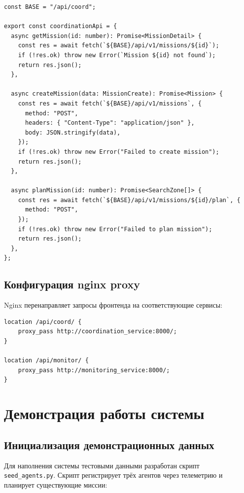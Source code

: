 \documentclass[12pt,a4paper]{article}
\begin{document}
\begin{lstlisting}[caption={frontend/src/api/coordinationApi.ts (фрагмент)}]
const BASE = "/api/coord";

export const coordinationApi = {
  async getMission(id: number): Promise<MissionDetail> {
    const res = await fetch(`${BASE}/api/v1/missions/${id}`);
    if (!res.ok) throw new Error(`Mission ${id} not found`);
    return res.json();
  },

  async createMission(data: MissionCreate): Promise<Mission> {
    const res = await fetch(`${BASE}/api/v1/missions`, {
      method: "POST",
      headers: { "Content-Type": "application/json" },
      body: JSON.stringify(data),
    });
    if (!res.ok) throw new Error("Failed to create mission");
    return res.json();
  },

  async planMission(id: number): Promise<SearchZone[]> {
    const res = await fetch(`${BASE}/api/v1/missions/${id}/plan`, {
      method: "POST",
    });
    if (!res.ok) throw new Error("Failed to plan mission");
    return res.json();
  },
};
\end{lstlisting}

\subsection{Конфигурация nginx proxy}

Nginx перенаправляет запросы фронтенда на соответствующие сервисы:

\begin{lstlisting}[style=bash, caption={frontend/nginx.conf (proxy-блоки)}]
location /api/coord/ {
    proxy_pass http://coordination_service:8000/;
}

location /api/monitor/ {
    proxy_pass http://monitoring_service:8000/;
}
\end{lstlisting}

\section{Демонстрация работы системы}

\subsection{Инициализация демонстрационных данных}

Для наполнения системы тестовыми данными разработан скрипт
\texttt{seed\_agents.py}. Скрипт регистрирует трёх агентов через телеметрию и
планирует существующие миссии:
\end{document}

